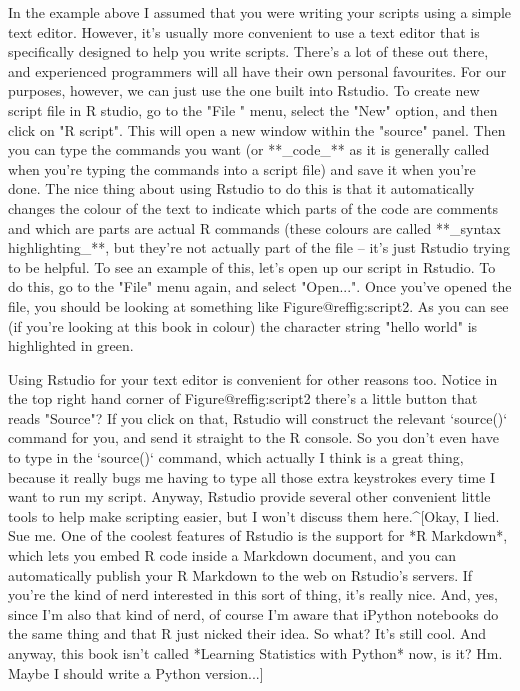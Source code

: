 In the example above I assumed that you were writing your scripts using a simple text editor. However, it's usually more convenient to use a text editor that is specifically designed to help you write scripts. There's a lot of these out there, and experienced programmers will all have their own personal favourites. For our purposes, however, we can just use the one built into Rstudio. To create new script file in R studio, go to the "File " menu, select the "New" option, and then click on "R script". This will open a new window within the "source" panel. Then you can type the commands you want (or **_code_** as it is generally called when you're typing the commands into a script file) and save it when you're done. The nice thing about using Rstudio to do this is that it automatically changes the colour of the text to indicate which parts of the code are comments and which are parts are actual R commands (these colours are called **_syntax highlighting_**, but they're not actually part of the file -- it's just Rstudio trying to be helpful. To see an example of this, let's open up our  script in Rstudio. To do this, go to the "File" menu again, and select "Open...". Once you've opened the file, you should be looking at something like Figure@reffig:script2. As you can see (if you're looking at this book in colour) the character string "hello world" is highlighted in green.

Using Rstudio for your text editor is convenient for other reasons too. Notice in the top right hand corner of Figure@reffig:script2 there's a little button that reads "Source"? If you click on that, Rstudio will construct the relevant `source()` command for you, and send it straight to the R console. So you don't even have to type in the `source()` command, which actually I think is a great thing, because it really bugs me having to type all those extra keystrokes every time I want to run my script. Anyway, Rstudio provide several other convenient little tools to help make scripting easier, but I won't discuss them here.^[Okay, I lied. Sue me. One of the coolest features of Rstudio is the support for *R Markdown*, which lets you embed R code inside a Markdown document, and you can automatically publish your R Markdown to the web on Rstudio's servers. If you're the kind of nerd interested in this sort of thing, it's really nice. And, yes, since I'm also that kind of nerd, of course I'm aware that iPython notebooks do the same thing and that R just nicked their idea. So what? It's still cool. And anyway, this book isn't called *Learning Statistics with Python* now, is it? Hm. Maybe I should write a Python version...]


